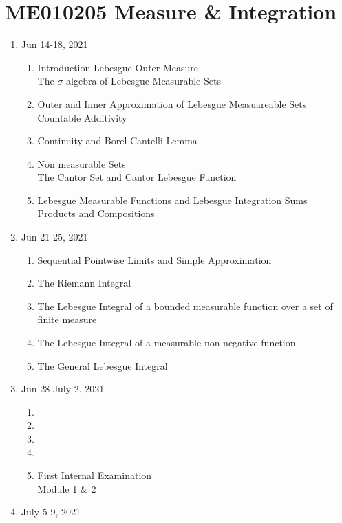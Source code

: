 \chapter{ME010205 Measure \& Integration}
\begin{enumerate}[label=Week \arabic*]
	\item Jun 14-18, 2021 
	\begin{enumerate}[label=Day \arabic*]
		\item 
			Introduction
			Lebesgue Outer Measure\\
			The $\sigma$-algebra of Lebesgue Measurable Sets
		\item 
			Outer and Inner Approximation of Lebesgue Measuareable Sets\\
			Countable Additivity
		\item 
			Continuity and Borel-Cantelli Lemma
		\item 
			Non measurable Sets\\
			The Cantor Set and Cantor Lebesgue Function
		\item 
			Lebesgue Measurable Functions and Lebesgue Integration Sums\\
			Products and Compositions
	\end{enumerate}
	\item Jun 21-25, 2021 
	\begin{enumerate}[label=Day \arabic*]
		\item 
			Sequential Pointwise Limits and Simple Approximation
		\item 
			The Riemann Integral
		\item 
			The Lebesgue Integral of a bounded measurable function over a set of finite measure
		\item 
			The Lebesgue Integral of a measurable non-negative function
		\item 
			The General Lebesgue Integral
	\end{enumerate}
	\item Jun 28-July 2, 2021 
	\begin{enumerate}[label=Day \arabic*]
		\item 
		\item 
		\item 
		\item 
		\item First Internal Examination \\
			Module 1 \& 2
	\end{enumerate}
	\item July 5-9, 2021 
	\begin{enumerate}[label=Day \arabic*]

\end{enumerate}
\end{enumerate}
